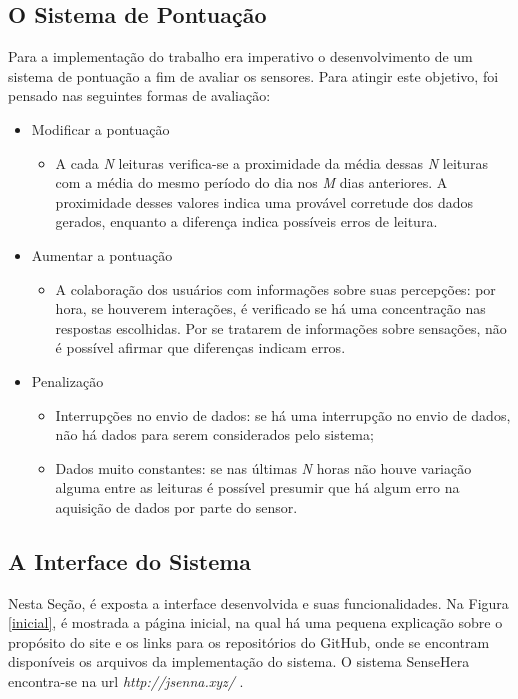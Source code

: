 \subsection{O Sistema de Pontuação}
\label{subsec:pontuacao}
\null \quad Para a implementação do trabalho era imperativo o desenvolvimento de um sistema de pontuação a fim de avaliar os sensores. Para atingir este objetivo, foi pensado nas seguintes formas de avaliação:
\begin{itemize}
  \item Modificar a pontuação
    \begin{itemize}
      \item A cada \textit{N} leituras verifica-se a proximidade da média dessas \textit{N} leituras com a média do mesmo período do dia nos \textit{M} dias anteriores. A proximidade desses valores indica uma provável corretude dos dados gerados, enquanto a diferença indica possíveis erros de leitura.
    \end{itemize}
  \item Aumentar a pontuação
  \begin{itemize}
    \item A colaboração dos usuários com informações sobre suas percepções: por hora, se houverem interações, é verificado se há uma concentração nas respostas escolhidas. Por se tratarem de informações sobre sensações, não é possível afirmar que diferenças indicam erros.
  \end{itemize}
  \item Penalização
    \begin{itemize}
      \item Interrupções no envio de dados: se há uma interrupção no envio de dados, não há dados para serem considerados pelo sistema;
      \item Dados muito constantes: se nas últimas \textit{N} horas não houve variação alguma entre as leituras é possível presumir que há algum erro na aquisição de dados por parte do sensor.
    \end{itemize}
\end{itemize}

\subsection{A Interface do Sistema}
\null \quad Nesta Seção, é exposta a interface desenvolvida e suas funcionalidades. Na Figura \ref{inicial},
é mostrada a página inicial, na qual há uma pequena explicação sobre o propósito do site e os links para os repositórios do GitHub, onde se encontram disponíveis os arquivos da implementação do sistema. O sistema SenseHera encontra-se na url \textit{http://jsenna.xyz/} .

